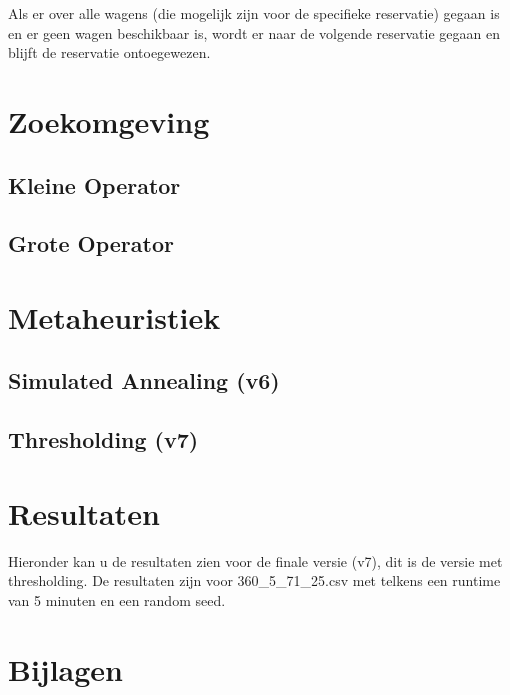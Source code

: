 \documentclass[a4paper, 12pt, one column]{article}
\begin{document}
Als er over alle wagens (die mogelijk zijn voor de specifieke reservatie) gegaan is en er geen wagen beschikbaar is, wordt er naar de volgende reservatie gegaan en blijft de reservatie ontoegewezen.

\section{Zoekomgeving}

\subsection{Kleine Operator}

\subsection{Grote Operator}

\section{Metaheuristiek}
\subsection{Simulated Annealing (v6)}

\subsection{Thresholding (v7)}

\section{Resultaten}
Hieronder kan u de resultaten zien voor de finale versie (v7), dit is de versie met thresholding. De resultaten zijn voor 360\_5\_71\_25.csv met telkens een runtime van 5 minuten en een random seed.

\begin{center}
\end{center}
\section{Bijlagen}
\end{document}
